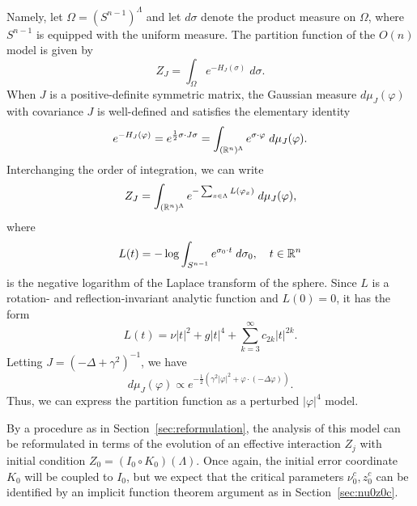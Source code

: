 Namely, let $\Omega = (S^{n-1})^\Lambda$ and let $d\sigma$ denote the product measure on $\Omega$,
where $S^{n-1}$ is equipped with the uniform
measure. The partition function of the $O(n)$ model is given by
\begin{equation}
Z_J = \int_\Omega e^{-H_J(\sigma)} \; d\sigma.
\end{equation}
When $J$ is a positive-definite symmetric matrix, the Gaussian measure $d\mu_J(\varphi)$
with covariance $J$ is well-defined and satisfies the elementary identity
\begin{equation}
e^{-H_J(\varphi)}
	=
e^{\frac12 \sigma \cdot J \sigma}
	=
\int_{({\mathbb R}^n)^\Lambda} e^{\sigma \cdot \varphi} \; d\mu_J(\varphi).
\end{equation}
Interchanging the order of integration, we can write
\begin{equation}
Z_J
	=
\int_{({\mathbb R}^n)^\Lambda}
e^{-\sum_{x\in\Lambda} L(\varphi_x)}
\; d\mu_J(\varphi),
\end{equation}
where
\begin{equation}
L(t)
	=
-\log
\int_{S^{n-1}} e^{\sigma_0 \cdot t} \; d\sigma_0,
	\quad
t\in{\mathbb R}^n
\end{equation}
is the negative logarithm of the Laplace transform of the sphere. Since $L$ is
a rotation- and reflection-invariant analytic function and $L(0) = 0$, it has
the form
\begin{equation}
\label{e:logLaplace}
L(t) = \nu |t|^2 + g |t|^4 + \sum_{k=3}^\infty c_{2k} |t|^{2k}.
\end{equation}
Letting $J = (-\Delta + \gamma^2)^{-1}$, we have
\begin{equation}
d\mu_J(\varphi)
	\propto
e^{-\frac12 (\gamma^2 |\varphi|^2 + \varphi \cdot (-\Delta \varphi))}.
\end{equation}
Thus, we can express the partition function as a perturbed $|\varphi|^4$ model.

By a procedure as in Section~\ref{sec:reformulation}, the analysis of this model
can be reformulated in terms of the evolution of an effective interaction $Z_j$
with initial condition $Z_0 = (I_0 \circ K_0)(\Lambda)$. Once again, the initial
error coordinate $K_0$ will be coupled to $I_0$, but we expect that the critical
parameters $\nu_0^c, z_0^c$ can be identified by an implicit function theorem
argument as in Section~\ref{sec:nu0z0c}.

